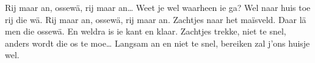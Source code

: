 \beginverse*
Rij maar an, ossewä, rij maar an… 
Weet je wel waarheen ie ga?
Wel naar huis toe rij die wä.
Rij maar an, ossewä, rij maar an.
\endverse
\beginverse*
Zachtjes naar het maïsveld. 
Daar lä men die ossewä.
En weldra is ie kant en klaar.
\endverse
\beginverse*
Zachtjes trekke, niet te snel,
anders wordt die os te moe…
Langsam an en niet te snel,
bereiken zal j’ons huisje wel.
\endverse
\endsong 